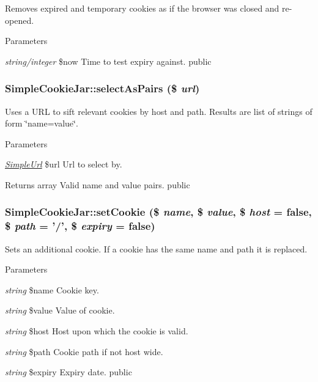 \label{class_simple_cookie_jar_aa31bb3d759c78564f9390a21d39bbc41}
Removes expired and temporary cookies as if the browser was closed and re-\/opened. 
\begin{DoxyParams}{Parameters}
\item[{\em string/integer}]\$now Time to test expiry against.  public \end{DoxyParams}
\hypertarget{class_simple_cookie_jar_abb79fd222ce94e548543061b50a291f3}{
\subsubsection[{selectAsPairs}]{\setlength{\rightskip}{0pt plus 5cm}SimpleCookieJar::selectAsPairs (\$ {\em url})}}
\label{class_simple_cookie_jar_abb79fd222ce94e548543061b50a291f3}
Uses a URL to sift relevant cookies by host and path. Results are list of strings of form \char`\"{}name=value\char`\"{}. 
\begin{DoxyParams}{Parameters}
\item[{\em \hyperlink{class_simple_url}{SimpleUrl}}]\$url Url to select by. \end{DoxyParams}
\begin{DoxyReturn}{Returns}
array Valid name and value pairs.  public 
\end{DoxyReturn}
\hypertarget{class_simple_cookie_jar_ac467b7bc604554da9133be361b32e803}{
\subsubsection[{setCookie}]{\setlength{\rightskip}{0pt plus 5cm}SimpleCookieJar::setCookie (\$ {\em name}, \/  \$ {\em value}, \/  \$ {\em host} = {\ttfamily false}, \/  \$ {\em path} = {\ttfamily '/'}, \/  \$ {\em expiry} = {\ttfamily false})}}
\label{class_simple_cookie_jar_ac467b7bc604554da9133be361b32e803}
Sets an additional cookie. If a cookie has the same name and path it is replaced. 
\begin{DoxyParams}{Parameters}
\item[{\em string}]\$name Cookie key. \item[{\em string}]\$value Value of cookie. \item[{\em string}]\$host Host upon which the cookie is valid. \item[{\em string}]\$path Cookie path if not host wide. \item[{\em string}]\$expiry Expiry date.  public \end{DoxyParams}
